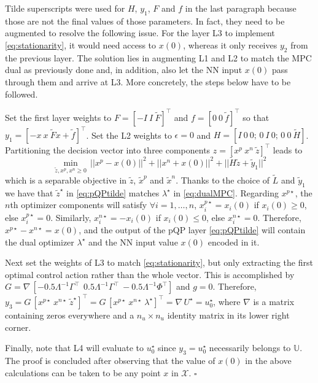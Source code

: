 Tilde superscripts were used for $H$, $y_1$, $F$ and $f$ in the last paragraph because those are not the final values of those parameters. In fact, they need to be augmented to resolve the following issue. For the layer L3 to implement \eqref{eq:stationarity}, it would need access to $x(0)$, whereas it only receives $y_2$ from the previous layer. The solution lies in augmenting L1 and L2 to match the MPC dual as previously done and, in addition, also let the NN input $x(0)$ pass through them and arrive at L3. More concretely, the steps below have to be followed.

Set the first layer weights to $F = [-I \ I \ \tilde{F}]^\top$ and $f = [0 \ 0 \ \tilde{f}]^\top$ so that $y_1 = [-x \ x \ \tilde{F}x + \tilde{f}]^\top$. Set the L2 weights to $\epsilon = 0$ and $H = [I \ 0 \ 0; \,0 \ I \ 0; \, 0 \ 0 \ \tilde{H}]$. Partitioning the decision vector into three components $z = [x^p \ x^n \ \tilde{z}]^\top$ leads to
\begin{equation}
	\label{eq:pQPtilde}
	\min_{\tilde{z},x^p,x^n \geq 0} \, ||x^p - x(0)||^{2} + ||x^n + x(0)||^{2} + ||\tilde{H}\tilde{z} + \tilde{y}_1||^{2} 
\end{equation}
which is a separable objective in $\tilde{z}$, $\tilde{x}^p$ and $\tilde{x}^n$. Thanks to the choice of $\tilde{L}$ and $\tilde{y}_1$ we have that $\tilde{z}^\star$ in \eqref{eq:pQPtilde} matches $\lambda^\star$ in \eqref{eq:dualMPC}. Regarding $x^{p\star}$, the $n$th optimizer components will satisfy $\forall i = 1,\dots,n$, $x^{p\star}_i = x_i(0)$ if $x_i(0) \geq 0$, else $x^{p\star}_i = 0$. Similarly, $x^{n\star}_i = -x_i(0)$ if $x_i(0) \leq 0$, else $x^{n\star}_i = 0$. Therefore, $x^{p\star} - x^{n\star} = x(0)$, and the output of the pQP layer \eqref{eq:pQPtilde} will contain the dual optimizer $\lambda^\star$ and the NN input value $x(0)$ encoded in it.

Next set the weights of L3 to match \eqref{eq:stationarity}, but only extracting the first optimal control action rather than the whole vector. This is accomplished by $G = \nabla\, [-0.5 \Lambda^{-1}\Gamma^\top \ \ 0.5\Lambda^{-1}\Gamma^\top \ - 0.5 \Lambda^{-1}\Phi^\top ]$ and $g = 0$. Therefore, $y_3 = G \, [x^{p \star} \ x^{n\star} \ \tilde{z}^\star ]^\top = G \, [x^{p \star} \ x^{n\star} \ \lambda^\star]^\top = \nabla\, U^\star = u_0^\star$, where $\nabla$ is a matrix containing zeros everywhere and a $n_u \times n_u$ identity matrix in its lower right corner.

Finally, note that L4 will evaluate to $u_0^\star$ since $y_3 = u_0^\star$ necessarily belongs to $\mathbb{U}$. The proof is concluded after observing that the value of $x(0)$ in the above calculations can be taken to be any point $x$ in $\mathcal{X}$. $\square$

